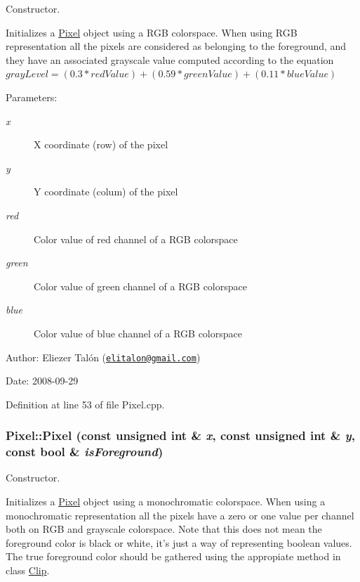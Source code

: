 Constructor. 

Initializes a \hyperlink{class_pixel}{Pixel} object using a RGB colorspace. When using RGB representation all the pixels are considered as belonging to the foreground, and they have an associated grayscale value computed according to the equation $grayLevel = (0.3 * redValue) + (0.59 * greenValue) + (0.11 * blueValue) $

\begin{Desc}
\item[Parameters:]
\begin{description}
\item[{\em x}]X coordinate (row) of the pixel \item[{\em y}]Y coordinate (colum) of the pixel \item[{\em red}]Color value of red channel of a RGB colorspace \item[{\em green}]Color value of green channel of a RGB colorspace \item[{\em blue}]Color value of blue channel of a RGB colorspace\end{description}
\end{Desc}
\begin{Desc}
\item[Author:]Eliezer Talón (\href{mailto:elitalon@gmail.com}{\tt elitalon@gmail.com}) \end{Desc}
\begin{Desc}
\item[Date:]2008-09-29 \end{Desc}


Definition at line 53 of file Pixel.cpp.\hypertarget{class_pixel_4657a977426649b6c56613971770fea6}{
\subsubsection[Pixel]{\setlength{\rightskip}{0pt plus 5cm}Pixel::Pixel (const unsigned int \& {\em x}, \/  const unsigned int \& {\em y}, \/  const bool \& {\em isForeground})}}
\label{class_pixel_4657a977426649b6c56613971770fea6}


Constructor. 

Initializes a \hyperlink{class_pixel}{Pixel} object using a monochromatic colorspace. When using a monochromatic representation all the pixels have a zero or one value per channel both on RGB and grayscale colorspace. Note that this does not mean the foreground color is black or white, it's just a way of representing boolean values. The true foreground color should be gathered using the appropiate method in class \hyperlink{class_clip}{Clip}.

